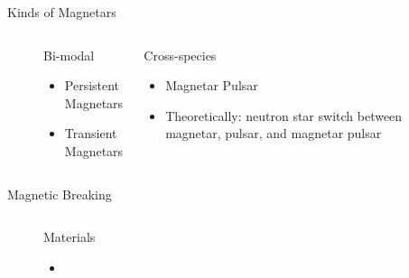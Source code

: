 \documentclass[hyperref=pdftex, presentation]{beamer}
\begin{document}
\begin{frame}{\Large Kinds of Magnetars}
	\begin{figure}
		\begin{columns}[c] %

			\begin{block}{Bi-modal}
				\begin{itemize}
					\item<2-> Persistent Magnetars
					\item<3-> Transient Magnetars
				\end{itemize}
			\end{block}
			\begin{block}{Cross-species}
				\begin{itemize}
 					\item<4-> Magnetar Pulsar%
 					\item<5-> Theoretically: neutron star switch between magnetar, pulsar, and magnetar pulsar
				\end{itemize}
			\end{block}
			

		\end{columns}
	\end{figure}
\end{frame}


\begin{frame}{\Large Magnetic Breaking}
	\begin{figure}
		\begin{columns}[c] %
			
			\begin{block}{Materials}
				\begin{itemize}
 					\item<2-> 
				\end{itemize}
			\end{block}
			
		\end{columns}
	\end{figure}
\end{frame}
\end{document}

